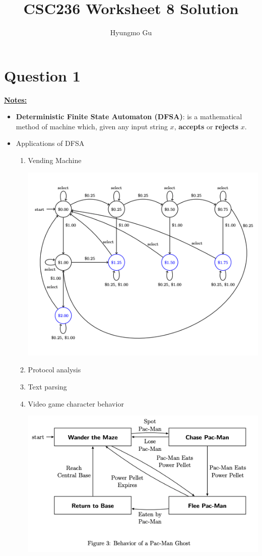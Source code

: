 \documentclass[12pt]{article}
\begin{document}
\title{CSC236 Worksheet 8 Solution}
\author{Hyungmo Gu}
\maketitle

\section*{Question 1}

\bigskip

\underline{\textbf{Notes:}}

\bigskip

\begin{itemize}
    \item \textbf{Deterministic Finite State Automaton (DFSA)}: is a mathematical
    method of machine which, given any input string $x$, \textbf{accepts} or
    \textbf{rejects} $x$.

    \item Applications of DFSA
    \begin{enumerate}[1.]
        \item Vending Machine
        \begin{center}
        \includegraphics[width=0.8 \linewidth]{images/worksheet_8_notes_1.png}
        \end{center}

        \item Protocol analysis
        \item Text parsing
        \item Video game character behavior

        \begin{center}
        \includegraphics[width=0.8 \linewidth]{images/worksheet_8_notes_2.png}
        \end{center}


\end{enumerate}
\end{itemize}
\end{document}

